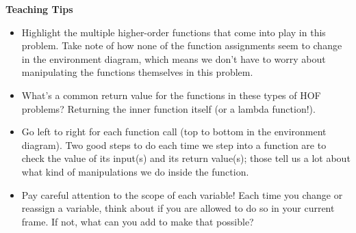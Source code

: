\begin{blocksection}
\begin{guide}
\textbf{Teaching Tips}
\begin{itemize}
\item Highlight the multiple higher-order functions that come into play in this problem. Take note of how none of the function assignments seem to change in the environment diagram, which means we don't have to worry about manipulating the functions themselves in this problem.
\item What's a common return value for the functions in these types of HOF problems? Returning the inner function itself (or a lambda function!).
\item Go left to right for each function call (top to bottom in the environment diagram). Two good steps to do each time we step into a function are to check the value of its input(s) and its return value(s); those tell us a lot about what kind of manipulations we do inside the function.
\item Pay careful attention to the scope of each variable! Each time you change or reassign a variable, think about if you are allowed to do so in your current frame. If not, what can you add to make that possible?
\end{itemize}
\end{guide}
\end{blocksection}

